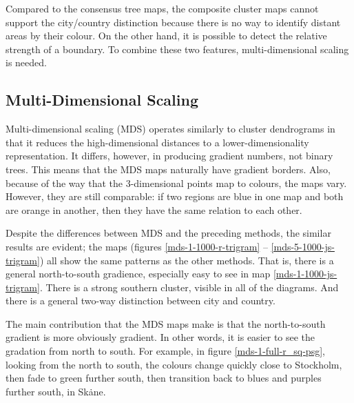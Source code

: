 Compared to the consensus tree maps, the composite cluster maps cannot
support the city/country distinction because there is no way to
identify distant areas by their colour. On the other hand, it is
possible to detect the relative strength of a boundary. To combine
these two features, multi-dimensional scaling is needed.


\subsection{Multi-Dimensional Scaling}

Multi-dimensional scaling (MDS) operates similarly to cluster
dendrograms in that it reduces the high-dimensional distances to a
lower-dimensionality representation. It differs, however, in producing
gradient numbers, not binary trees. This means that the MDS maps
naturally have gradient borders. Also, because of the way that the
3-dimensional points map to colours, the maps vary. However, they are
still comparable: if two regions are blue in one map and both are
orange in another, then they have the same relation to each other.

Despite the differences between MDS and the preceding methods, the
similar results are evident; the maps (figures
\ref{mds-1-1000-r-trigram} -- \ref{mds-5-1000-js-trigram}) all show
the same patterns as the other methods. That is, there is a general
north-to-south gradience, especially easy to see in map
\ref{mds-1-1000-js-trigram}. There is a strong southern cluster,
visible in all of the diagrams. And there is a general two-way
distinction between city and country.

The main contribution that the MDS maps make is that the
north-to-south gradient is more obviously gradient. In other words, it
is easier to see the gradation from north to south. For example, in
figure \ref{mds-1-full-r_sq-psg}, looking from the north to south, the
colours change quickly close to Stockholm, then fade to green further
south, then transition back to blues and purples further south, in
Sk\.ane.

